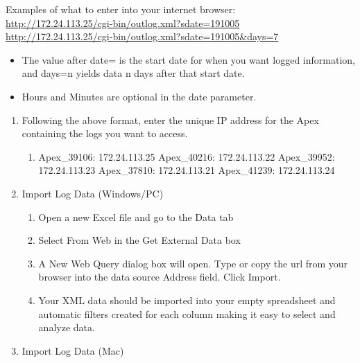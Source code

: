 \documentclass[]{book}
\providecommand{\tightlist}{%
  \setlength{\itemsep}{0pt}\setlength{\parskip}{0pt}}
\begin{document}
Examples of what to enter into your internet browser:\\
\url{http://172.24.113.25/cgi-bin/outlog.xml?sdate=191005}\\
\url{http://172.24.113.25/cgi-bin/outlog.xml?sdate=191005\&days=7}

\begin{itemize}
\tightlist
\item
  The value after date= is the start date for when you want logged
  information, and days=n yields data n days after that start date.
\item
  Hours and Minutes are optional in the date parameter.
\end{itemize}

\begin{enumerate}
\def\labelenumi{\arabic{enumi}.}
\tightlist
\item
  Following the above format, enter the unique IP address for the Apex
  containing the logs you want to access.

  \begin{enumerate}
  \def\labelenumii{\arabic{enumii}.}
  \tightlist
  \item
    Apex\_39106: 172.24.113.25 Apex\_40216: 172.24.113.22 Apex\_39952:
    172.24.113.23 Apex\_37810: 172.24.113.21 Apex\_41239: 172.24.113.24
  \end{enumerate}
\item
  Import Log Data (Windows/PC)

  \begin{enumerate}
  \def\labelenumii{\arabic{enumii}.}
  \tightlist
  \item
    Open a new Excel file and go to the Data tab
  \item
    Select From Web in the Get External Data box
  \item
    A New Web Query dialog box will open. Type or copy the url from your
    browser into the data source Address field. Click Import.
  \item
    Your XML data should be imported into your empty spreadsheet and
    automatic filters created for each column making it easy to select
    and analyze data.
  \end{enumerate}
\item
  Import Log Data (Mac)


\end{enumerate}
\end{document}
